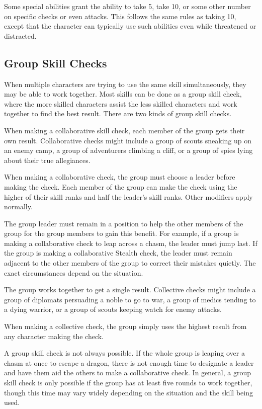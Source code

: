  Some special abilities grant the ability to take 5, take 10, or some other number on specific checks or even attacks. This follows the same rules as taking 10, except that the character can typically use such abilities even while threatened or distracted.

\subsection{Group Skill Checks}
When multiple characters are trying to use the same skill simultaneously, they may be able to work together. Most skills can be done as a group skill check, where the more skilled characters assist the less skilled characters and work together to find the best result. There are two kinds of group skill checks.

 When making a collaborative skill check, each member of the group gets their own result. Collaborative checks might include a group of scouts sneaking up on an enemy camp, a group of adventurers climbing a cliff, or a group of spies lying about their true allegiances.

When making a collaborative check, the group must choose a leader before making the check. Each member of the group can make the check using the higher of their skill ranks and half the leader's skill ranks. Other modifiers apply normally.

The group leader must remain in a position to help the other members of the group for the group members to gain this benefit. For example, if a group is making a collaborative check to leap across a chasm, the leader must jump last. If the group is making a collaborative Stealth check, the leader must remain adjacent to the other members of the group to correct their mistakes quietly. The exact circumstances depend on the situation. 

 The group works together to get a single result. Collective checks might include a group of diplomats persuading a noble to go to war, a group of medics tending to a dying warrior, or a group of scouts keeping watch for enemy attacks.

When making a collective check, the group simply uses the highest result from any character making the check.

 A group skill check is not always possible. If the whole group is leaping over a chasm at once to escape a dragon, there is not enough time to designate a leader and have them aid the others to make a collaborative check. In general, a group skill check is only possible if the group has at least five rounds to work together, though this time may vary widely depending on the situation and the skill being used. 

